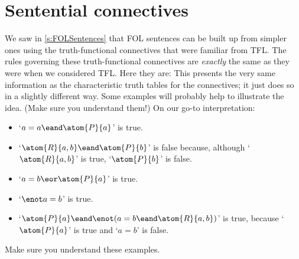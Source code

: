 \section{Sentential connectives}
We saw in \cref{s:FOLSentences} that FOL sentences can be built up from simpler ones using the truth-functional connectives that were familiar from TFL. The rules governing these truth-functional connectives are \emph{exactly} the same as they were when we considered TFL. Here they are:
This presents the very same information as the characteristic truth tables for the connectives; it just does so in a slightly different way. Some examples will probably help to illustrate the idea. (Make sure you understand them!) On our go-to interpretation:
	\begin{itemize}
		\item `$a = a \eand \atom{P}{a}$' is true.
		\item `$\atom{R}{a,b} \eand \atom{P}{b}$' is false because, although `$\atom{R}{a,b}$' is true, `$\atom{P}{b}$' is false.
		\item `$a = b \eor \atom{P}{a}$' is true.
		\item `$\enot a = b$' is true.
		\item `$\atom{P}{a} \eand \enot( a= b \eand \atom{R}{a,b})$' is true, because `$\atom{P}{a}$' is true and `$a = b$' is false.
	\end{itemize}
Make sure you understand these examples.

